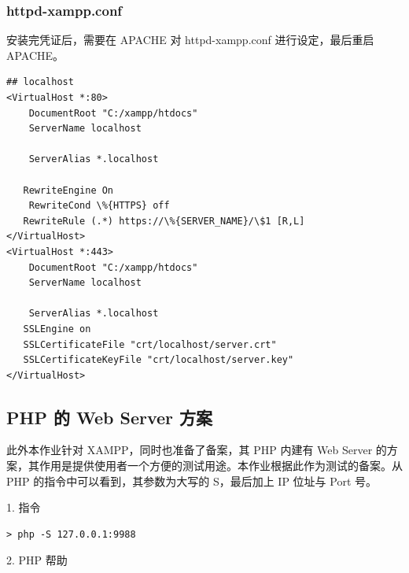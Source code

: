 \subsubsection{httpd-xampp.conf}

安装完凭证后，需要在 APACHE 对 httpd-xampp.conf 进行设定，最后重启 APACHE。

\begin{Verbatim}
## localhost
<VirtualHost *:80>
    DocumentRoot "C:/xampp/htdocs"
    ServerName localhost

    ServerAlias *.localhost

   RewriteEngine On
    RewriteCond \%{HTTPS} off
   RewriteRule (.*) https://\%{SERVER_NAME}/\$1 [R,L]
</VirtualHost>
<VirtualHost *:443>
    DocumentRoot "C:/xampp/htdocs"
    ServerName localhost

    ServerAlias *.localhost
   SSLEngine on
   SSLCertificateFile "crt/localhost/server.crt"
   SSLCertificateKeyFile "crt/localhost/server.key"
</VirtualHost>
\end{Verbatim}

\subsection{PHP 的 Web Server 方案}

此外本作业针对 XAMPP，同时也准备了备案，其 PHP 内建有 Web Server 的方案，其作用是提供使用者一个方便的测试用途。本作业根据此作为测试的备案。从 PHP 的指令中可以看到，其参数为大写的 S，最后加上 IP 位址与 Port 号。

1. 指令

\begin{Verbatim}
> php -S 127.0.0.1:9988
\end{Verbatim}

2. PHP 帮助

